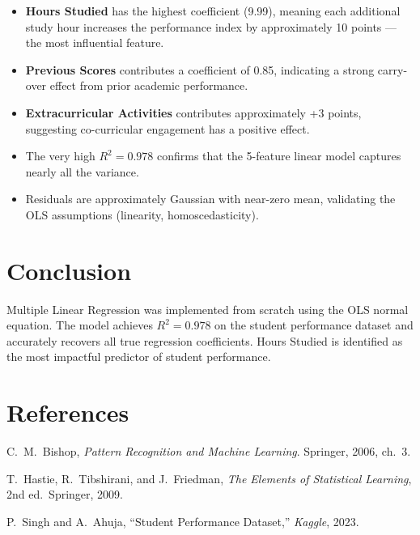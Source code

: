 \documentclass[12pt,a4paper]{article}
\begin{document}
\begin{itemize}
  \item \textbf{Hours Studied} has the highest coefficient (9.99), meaning each additional study hour increases the performance index by approximately 10 points — the most influential feature.
  \item \textbf{Previous Scores} contributes a coefficient of 0.85, indicating a strong carry-over effect from prior academic performance.
  \item \textbf{Extracurricular Activities} contributes approximately +3 points, suggesting co-curricular engagement has a positive effect.
  \item The very high $R^2 = 0.978$ confirms that the 5-feature linear model captures nearly all the variance.
  \item Residuals are approximately Gaussian with near-zero mean, validating the OLS assumptions (linearity, homoscedasticity).
\end{itemize}

\section{Conclusion}

Multiple Linear Regression was implemented from scratch using the OLS normal equation. The model achieves $R^2 = 0.978$ on the student performance dataset and accurately recovers all true regression coefficients. Hours Studied is identified as the most impactful predictor of student performance.

\section{References}
\begin{enumerate}[label={[\arabic*]}]
  \item C.\ M.\ Bishop, \textit{Pattern Recognition and Machine Learning}. Springer, 2006, ch.\ 3.
  \item T.\ Hastie, R.\ Tibshirani, and J.\ Friedman, \textit{The Elements of Statistical Learning}, 2nd ed.\ Springer, 2009.
  \item P.\ Singh and A.\ Ahuja, ``Student Performance Dataset,'' \textit{Kaggle}, 2023.
\end{enumerate}
\end{document}
